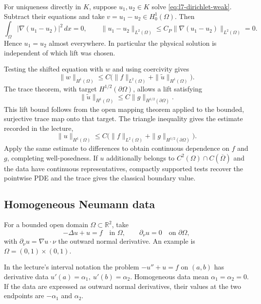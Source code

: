 \documentclass[11pt,a4paper]{article}
\begin{document}
For uniqueness directly in \(K\), suppose \(u_1,u_2\in K\) solve
\eqref{eq:l7-dirichlet-weak}. Subtract their equations and take
\(v=u_1-u_2\in H_0^1(\Omega)\). Then
\[
  \int_\Omega|\nabla(u_1-u_2)|^2\,dx=0,\qquad
  \|u_1-u_2\|_{L^2(\Omega)}
    \le C_P\|\nabla(u_1-u_2)\|_{L^2(\Omega)}=0 .
\]
Hence \(u_1=u_2\) almost everywhere. In particular the physical
solution is independent of which lift was chosen.

Testing the shifted equation with \(w\) and using coercivity gives
\[
  \|w\|_{H^1(\Omega)}
    \le C\bigl(\|f\|_{L^2(\Omega)}+\|\widetilde u\|_{H^1(\Omega)}\bigr).
\]
The trace theorem, with target \(H^{1/2}(\partial\Omega)\),
allows a lift satisfying
\[
  \|\widetilde u\|_{H^1(\Omega)}
    \le C\|g\|_{H^{1/2}(\partial\Omega)}.
\]
This lift bound follows from the open mapping theorem
applied to the bounded, surjective trace map onto that target.
The triangle inequality gives the estimate recorded in the
lecture,
\[
  \|u\|_{H^1(\Omega)}
   \le C\bigl(\|f\|_{L^2(\Omega)}
              +\|g\|_{H^{1/2}(\partial\Omega)}\bigr).
\]
Apply the same estimate to differences to obtain continuous
dependence on \(f\) and \(g\), completing well-posedness.
If \(u\) additionally belongs to \(C^2(\Omega)\cap
C(\overline\Omega)\) and the data have continuous
representatives, compactly supported tests recover the pointwise
PDE and the trace gives the classical boundary value.

\subsection{Homogeneous Neumann data}

For a bounded open domain \(\Omega\subset\mathbb R^2\), take
\[
  -\Delta u+u=f\quad\text{in }\Omega,\qquad
  \partial_\nu u=0\quad\text{on }\partial\Omega ,
\]
with \(\partial_\nu u=\nabla u\cdot\nu\) the outward normal
derivative. An example is \(\Omega=(0,1)\times(0,1)\).

\begin{center}
\end{center}

In the lecture's interval notation the problem
\(-u''+u=f\) on \((a,b)\) has derivative data
\(u'(a)=\alpha_1,\ u'(b)=\alpha_2\).
Homogeneous data mean \(\alpha_1=\alpha_2=0\).
If the data are expressed as outward normal derivatives, their
values at the two endpoints are \(-\alpha_1\) and \(\alpha_2\).
\end{document}
